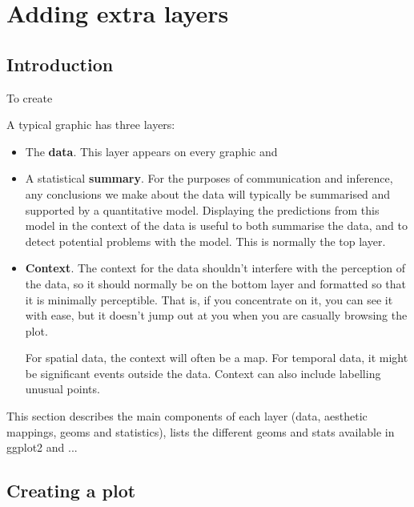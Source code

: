 


\chapter{Adding extra layers}

\section{Introduction}

To create 

A typical graphic has three layers:

\begin{itemize}
  \item The {\bf data}.  This layer appears on every graphic and 

  \item A statistical {\bf summary}.  For the purposes of communication and inference, any conclusions we make about the data will typically be summarised and supported by a quantitative model.  Displaying the predictions from this model in the context of the data is useful to both summarise the data, and to detect potential problems with the model.  This is normally the top layer.

  \item {\bf Context}.  The context for the data shouldn't interfere with the perception of the data, so it should normally be on the bottom layer and formatted so that it is minimally perceptible.  That is, if you concentrate on it, you can see it with ease, but it doesn't jump out at you when you are casually browsing the plot.
  
  For spatial data, the context will often be a map.  For temporal data, it might be significant events outside the data.  Context can also include labelling unusual points.
\end{itemize}

This section describes the main components of each layer (data, aesthetic mappings, geoms and statistics), lists the different geoms and stats available in ggplot2 and ...

\section{Creating a plot}
\label{sec:ggplot}

